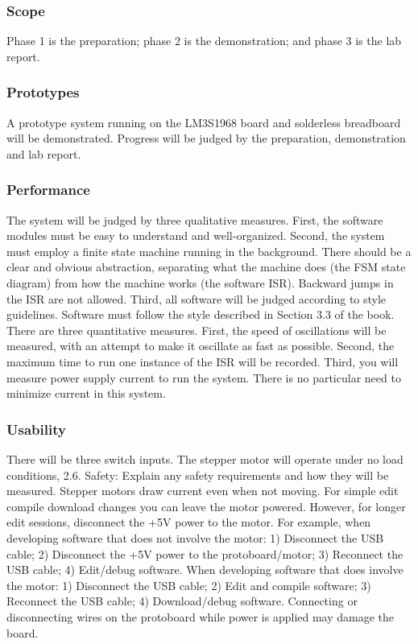 \documentclass[twoside]{article}
\begin{document}
\subsubsection*{Scope}
Phase 1 is the preparation; phase 2 is the demonstration; and phase 3 is the lab report. 

\subsubsection*{Prototypes}
A prototype system running on the LM3S1968 board and solderless breadboard will be demonstrated. Progress will be judged by the preparation, demonstration and lab report.
\subsubsection*{Performance}
The system will be judged by three qualitative measures. First, the software modules must be easy to understand and well-organized. Second, the system must employ a finite state machine running in the background. There should be a clear and obvious abstraction, separating what the machine does (the FSM state diagram) from how the machine works (the software ISR). Backward jumps in the ISR are not allowed. Third, all software will be judged according to style guidelines. Software must follow the style described in Section 3.3 of the book. There are three quantitative measures. First, the speed of oscillations will be measured, with an attempt to make it oscillate as fast as possible. Second, the maximum time to run one instance of the ISR will be recorded. Third, you will measure power supply current to run the system. There is no particular need to minimize current in this system.
\subsubsection*{Usability} 
There will be three switch inputs. The stepper motor will operate under no load conditions, 2.6. Safety: Explain any safety requirements and how they will be measured. Stepper motors draw current even when not moving. For simple edit compile download changes you can leave the motor powered. However, for longer edit sessions, disconnect the +5V power to the motor. For example, when developing software that does not involve the motor: 1) Disconnect the USB cable; 2) Disconnect the +5V power to the protoboard/motor; 3) Reconnect the USB cable; 4) Edit/debug software. When developing software that does involve the motor: 1) Disconnect the USB cable; 2) Edit and compile software; 3) Reconnect the USB cable; 4) Download/debug software. Connecting or disconnecting wires on the protoboard while power is applied may damage the board.
\end{document}
